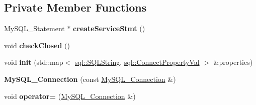 \subsection*{Private Member Functions}
\begin{DoxyCompactItemize}
\item 
\hypertarget{classsql_1_1mysql_1_1_my_s_q_l___connection_a99bbbb206d737a3c2a098f9005e24d6a}{}\label{classsql_1_1mysql_1_1_my_s_q_l___connection_a99bbbb206d737a3c2a098f9005e24d6a} 
My\+S\+Q\+L\+\_\+\+Statement $\ast$ {\bfseries create\+Service\+Stmt} ()
\item 
\hypertarget{classsql_1_1mysql_1_1_my_s_q_l___connection_a87aae788d1083b16d49071dbae5aeb42}{}\label{classsql_1_1mysql_1_1_my_s_q_l___connection_a87aae788d1083b16d49071dbae5aeb42} 
void {\bfseries check\+Closed} ()
\item 
\hypertarget{classsql_1_1mysql_1_1_my_s_q_l___connection_a627c6c2e541187545eeeae73f78638c9}{}\label{classsql_1_1mysql_1_1_my_s_q_l___connection_a627c6c2e541187545eeeae73f78638c9} 
void {\bfseries init} (std\+::map$<$ \hyperlink{classsql_1_1_s_q_l_string}{sql\+::\+S\+Q\+L\+String}, \hyperlink{classsql_1_1_variant}{sql\+::\+Connect\+Property\+Val} $>$ \&properties)
\item 
\hypertarget{classsql_1_1mysql_1_1_my_s_q_l___connection_ad0ef40dd00878160834850df68a1efc8}{}\label{classsql_1_1mysql_1_1_my_s_q_l___connection_ad0ef40dd00878160834850df68a1efc8} 
{\bfseries My\+S\+Q\+L\+\_\+\+Connection} (const \hyperlink{classsql_1_1mysql_1_1_my_s_q_l___connection}{My\+S\+Q\+L\+\_\+\+Connection} \&)
\item 
\hypertarget{classsql_1_1mysql_1_1_my_s_q_l___connection_a1973c5e0c52e0f5fa602a166a7d814fd}{}\label{classsql_1_1mysql_1_1_my_s_q_l___connection_a1973c5e0c52e0f5fa602a166a7d814fd} 
void {\bfseries operator=} (\hyperlink{classsql_1_1mysql_1_1_my_s_q_l___connection}{My\+S\+Q\+L\+\_\+\+Connection} \&)
\end{DoxyCompactItemize}
